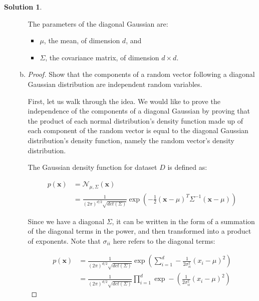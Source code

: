 \documentclass{article}
\theoremstyle{definition}
\newtheorem*{solution}{Solution}
\begin{document}
\begin{solution}
\begin{enumerate}[1.]
\begin{enumerate}[(a)]
                    The parameters of the diagonal Gaussian are:
                    \begin{itemize}
                    	\item $\mu$, the mean, of dimension $d$, and
                        \item $\Sigma$, the covariance matrix, of dimension $d \times d$.
                    \end{itemize}
                    
            	\item 
                	\begin{proof}
                    	Show that the components of a random vector following a diagonal Gaussian distribution are independent random variables.
                        
                        First, let us walk through the idea. We would like to prove the independence of the components of a diagonal Gaussian by proving that the product of each normal distribution's density function made up of each component of the random vector is equal to the diagonal Gaussian distribution's density function, namely the random vector's density distribution.
                        
                        The Gaussian density function for dataset $D$ is defined as:
                        
                        \begin{equation*}
							\begin{split}
								p(\bm{x}) & = \mathcal{N}_{\mu, \Sigma}(\bm{x})\\
                                & = \frac{1}{(2\pi)^{d/2}\sqrt{det(\Sigma)}} \exp(-\frac{1}{2}(\bm{x} - \mu)^T \Sigma^{-1} (\bm{x} - \mu))
                            \end{split}
						\end{equation*}
                        
                        Since we have a diagonal $\Sigma$, it can be written in the form of a summation of the diagonal terms in the power, and then transformed into a product of exponents. Note that $\sigma_{ii}$ here refers to the diagonal terms:
                        
                        \begin{equation*}
                        	\begin{split}
							p(\bm{x}) & = \frac{1}{(2\pi)^{d/2}\sqrt{det(\Sigma)}} \exp(\sum_{i=1}^{d} -\frac{1}{2 \sigma_{ii}^2}(x_i - \mu)^2) \\
                            & = \frac{1}{(2\pi)^{d/2}\sqrt{det(\Sigma)}} \prod_{i=1}^{d} \exp -\left(\frac{1}{2 \sigma_{ii}^2}(x_i - \mu)^2\right)
                            \end{split}
						\end{equation*}
                        

\end{proof}
\end{enumerate}
\end{enumerate}
\end{solution}
\end{document}
